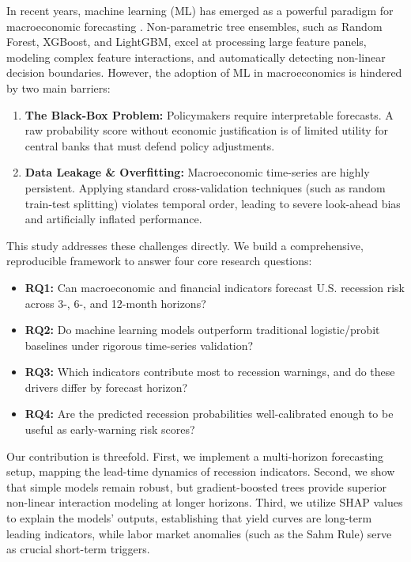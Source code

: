 \documentclass[11pt]{article}
\begin{document}
In recent years, machine learning (ML) has emerged as a powerful paradigm for macroeconomic forecasting \citep{berardi2015macroeconomic}. Non-parametric tree ensembles, such as Random Forest, XGBoost, and LightGBM, excel at processing large feature panels, modeling complex feature interactions, and automatically detecting non-linear decision boundaries. However, the adoption of ML in macroeconomics is hindered by two main barriers:
\begin{enumerate}
    \item \textbf{The Black-Box Problem:} Policymakers require interpretable forecasts. A raw probability score without economic justification is of limited utility for central banks that must defend policy adjustments.
    \item \textbf{Data Leakage & Overfitting:} Macroeconomic time-series are highly persistent. Applying standard cross-validation techniques (such as random train-test splitting) violates temporal order, leading to severe look-ahead bias and artificially inflated performance.
\end{enumerate}

This study addresses these challenges directly. We build a comprehensive, reproducible framework to answer four core research questions:
\begin{itemize}
    \item \textbf{RQ1:} Can macroeconomic and financial indicators forecast U.S. recession risk across 3-, 6-, and 12-month horizons?
    \item \textbf{RQ2:} Do machine learning models outperform traditional logistic/probit baselines under rigorous time-series validation?
    \item \textbf{RQ3:} Which indicators contribute most to recession warnings, and do these drivers differ by forecast horizon?
    \item \textbf{RQ4:} Are the predicted recession probabilities well-calibrated enough to be useful as early-warning risk scores?
\end{itemize}

Our contribution is threefold. First, we implement a multi-horizon forecasting setup, mapping the lead-time dynamics of recession indicators. Second, we show that simple models remain robust, but gradient-boosted trees provide superior non-linear interaction modeling at longer horizons. Third, we utilize SHAP values to explain the models' outputs, establishing that yield curves are long-term leading indicators, while labor market anomalies (such as the Sahm Rule) serve as crucial short-term triggers.
\end{document}
